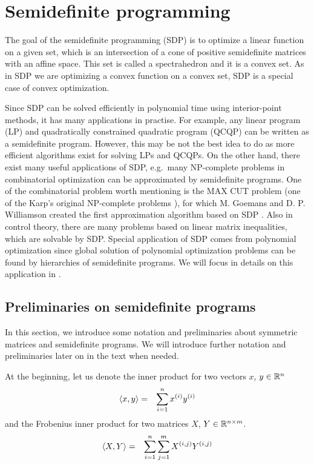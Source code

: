 \chapter{Semidefinite programming}
The goal of the semidefinite programming (SDP) is to optimize a linear function on a given set, which is an intersection of a cone of positive semidefinite matrices with an affine space.
This set is called a spectrahedron and it is a convex set.
As in SDP we are optimizing a convex function on a convex set, SDP is a special case of convex optimization.

Since SDP can be solved efficiently in polynomial time using interior-point methods, it has many applications in practise.
For example, any linear program (LP) and quadratically constrained quadratic program (QCQP) can be written as a semidefinite program.
However, this may be not the best idea to do as more efficient algorithms exist for solving LPs and QCQPs.
On the other hand, there exist many useful applications of SDP, e.g.\ many NP-complete problems in combinatorial optimization can be approximated by semidefinite programs. 
One of the combinatorial problem worth mentioning is the MAX CUT problem (one of the Karp's original NP-complete problems \cite{karp1972}), for which M. Goemans and D. P. Williamson created the first approximation algorithm based on SDP \cite{max-cut}.
Also in control theory, there are many problems based on linear matrix inequalities, which are solvable by SDP.\@
Special application of SDP comes from polynomial optimization since global solution of polynomial optimization problems can be found by hierarchies of semidefinite programs.
We will focus in details on this application in .

\section{Preliminaries on semidefinite programs}
In this section, we introduce some notation and preliminaries about symmetric matrices and semidefinite programs.
We will introduce further notation and preliminaries later on in the text when needed.

At the beginning, let us denote the inner product for two vectors $x$, $y \in\mathbb{R}^n$
\begin{eqnarray}
  \langle x, y\rangle &=& \sum_{i=1}^n x^{(i)}y^{(i)}
\end{eqnarray}
and the Frobenius inner product for two matrices $X$, $Y\in\mathbb{R}^{n\times m}$.
\begin{eqnarray}
  \langle X, Y\rangle &=& \sum_{i=1}^n \sum_{j=1}^m X^{(i,j)}Y^{(i,j)}
\end{eqnarray}

